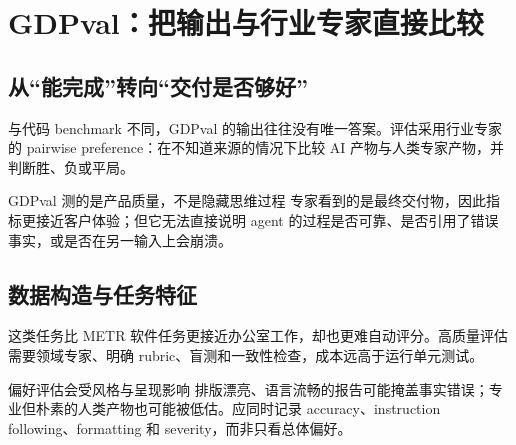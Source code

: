 \section{GDPval：把输出与行业专家直接比较}

\subsection{从“能完成”转向“交付是否够好”}




与代码 benchmark 不同，GDPval 的输出往往没有唯一答案。评估采用行业专家的 pairwise preference：在不知道来源的情况下比较 AI 产物与人类专家产物，并判断胜、负或平局。

\begin{importantbox}{GDPval 测的是产品质量，不是隐藏思维过程}
专家看到的是最终交付物，因此指标更接近客户体验；但它无法直接说明 agent 的过程是否可靠、是否引用了错误事实，或是否在另一输入上会崩溃。
\end{importantbox}

\subsection{数据构造与任务特征}



这类任务比 METR 软件任务更接近办公室工作，却也更难自动评分。高质量评估需要领域专家、明确 rubric、盲测和一致性检查，成本远高于运行单元测试。

\begin{warningbox}{偏好评估会受风格与呈现影响}
排版漂亮、语言流畅的报告可能掩盖事实错误；专业但朴素的人类产物也可能被低估。应同时记录 accuracy、instruction following、formatting 和 severity，而非只看总体偏好。
\end{warningbox}

